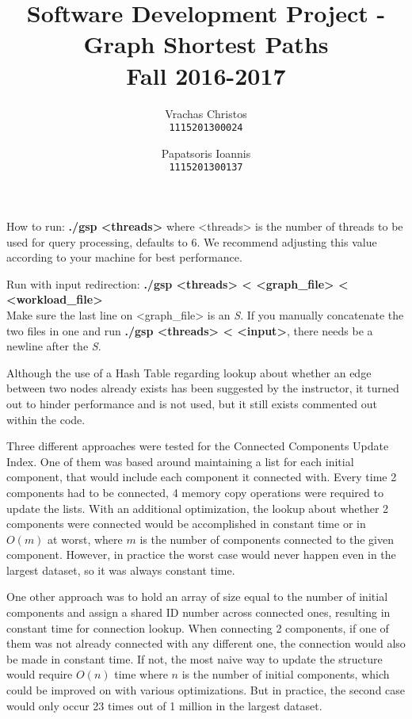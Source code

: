 \documentclass[11pt]{article}
\title{Software Development Project - Graph Shortest Paths \\ Fall 2016-2017}
\author{Vrachas Christos \\ \texttt{1115201300024}
\and
Papatsoris Ioannis \\ \texttt{1115201300137}}
\date{}
\begin{document}
\maketitle

How to run: \textbf{./gsp <threads>} 
	where <threads> is the number of threads to be used for query processing, defaults to 6.
	We recommend adjusting this value according to your machine for best performance.

Run with input redirection: \textbf{./gsp <threads> < <graph\_file> < <workload\_file>}\\
	Make sure the last line on <graph\_file> is an \textit{S}.
	If you manually concatenate the two files in one and run \textbf{./gsp <threads> < <input>}, 
	there needs be a newline after the \textit{S}.

\vspace{5mm}

Although the use of a Hash Table regarding lookup about whether an edge between two nodes already exists has been suggested by the instructor, it turned out to hinder performance and is not used, but it still exists commented out within the code.

\vspace{5mm}

Three different approaches were tested for the Connected Components Update Index.
One of them was based around maintaining a list for each initial component, that would include each component it connected with.
Every time 2 components had to be connected, 4 memory copy operations were required to update the lists.
With an additional optimization, the lookup about whether 2 components were connected would be accomplished
in constant time or in $O(m)$ at worst, where $m$ is the number of components connected to the given component. 
However, in practice the worst case would never happen even in the largest dataset, so it was always constant time.

One other approach was to hold an array of size equal to the number of initial components and assign
a shared ID number across connected ones, resulting in constant time for connection lookup.
When connecting 2 components, if one of them was not already connected with any different one, the connection would also be made in constant time.
If not, the most naive way to update the structure would require $O(n)$ time where $n$ is the number of initial components, which could be improved on with various optimizations.
But in practice, the second case would only occur 23 times out of 1 million in the largest dataset.
\end{document}
